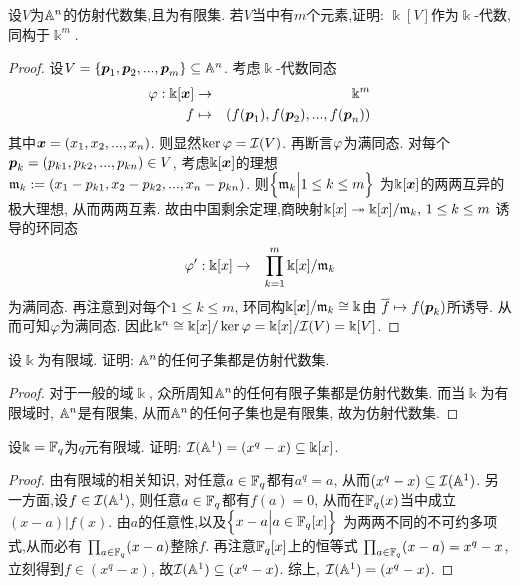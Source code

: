 \documentclass[oneside,a4papar,11pt,UTF8]{book}
\begin{document}
\begin{enumerate}
  \begin{prob}\label{ex-15-1-16}
    设$V$为$\mathbb{A}^n$的仿射代数集,且为有限集.
    若$V$当中有$m$个元素,证明:
    $\Bbbk[V]$作为$\Bbbk$-代数,同构于$\Bbbk^m$.
  \end{prob}

  \begin{proof}
    设$V=\{\boldsymbol{p}_1,\boldsymbol{p}_2,...,\boldsymbol{p}_m\}\subseteq\mathbb{A}^n$.
    考虑$\Bbbk$-代数同态
    \begin{eqnarray*}
      \varphi:\Bbbk[\boldsymbol{x}]&\to&\Bbbk^m\\
      f&\mapsto&(f(\boldsymbol{p}_1),f(\boldsymbol{p}_2),...,f(\boldsymbol{p}_n))
    \end{eqnarray*}
    其中$\boldsymbol{x}=(x_1,x_2,...,x_n)$.
    则显然$\ker\varphi=\mathcal{I}(V)$.
    再断言$\varphi$为满同态.
    对每个$\boldsymbol{p}_k=(p_{k1},p_{k2},...,p_{kn})\in V$,
    考虑$\Bbbk[\boldsymbol{x}]$的理想
    $\mathfrak{m}_k:=(x_1-p_{k1}, x_2-p_{k2},...,x_n-p_{kn})$.
    则$\Big\{ \mathfrak{m}_k \Big| 1\leq k\leq m \Big\}$
    为$\Bbbk[\boldsymbol{x}]$的两两互异的极大理想,
    从而两两互素.
    故由中国剩余定理,商映射$\Bbbk[x]\twoheadrightarrow\Bbbk[x]/\mathfrak{m}_k,\,1\leq k\leq m$
    诱导的环同态
    \begin{eqnarray*}
      \varphi':\Bbbk[x]&\to&\prod_{k=1}^{m}\Bbbk[x]/\mathfrak{m}_k
    \end{eqnarray*}
    为满同态.
    再注意到对每个$1\leq k\leq m$,
    环同构$\Bbbk[\boldsymbol{x}]/\mathfrak{m}_k\cong\Bbbk$由
    $\overline{f}\mapsto f(\boldsymbol{p}_k)$所诱导.
    从而可知$\varphi$为满同态.
    因此$\Bbbk^n\cong\Bbbk[x]/\ker\varphi=\Bbbk[x]/\mathcal{I}(V)=\Bbbk[V]$.

  \end{proof}

  \begin{prob}\label{ex-15-1-17}
    设$\Bbbk$为有限域.
    证明: $\mathbb{A}^n$的任何子集都是仿射代数集.
  \end{prob}

  \begin{proof}
    对于一般的域$\Bbbk$,
    众所周知$\mathbb{A}^n$的任何有限子集都是仿射代数集.
    而当$\Bbbk$为有限域时,
    $\mathbb{A}^n$是有限集,
    从而$\mathbb{A}^n$的任何子集也是有限集,
    故为仿射代数集.
  \end{proof}

  \begin{prob}\label{ex-15-1-18}
    设$\Bbbk=\mathbb{F}_q$为$q$元有限域.
    证明: $\mathcal{I}(\mathbb{A}^1)=(x^q-x)\subseteq\Bbbk[x]$.
  \end{prob}

  \begin{proof}
    由有限域的相关知识,
    对任意$a\in\mathbb{F}_q$都有$a^q=a$,
    从而$(x^q-x)\subseteq\mathcal{I}(\mathbb{A}^1)$.
    另一方面,设$f\in\mathcal{I}(\mathbb{A}^1)$,
    则任意$a\in\mathbb{F}_q$都有$f(a)=0$,
    从而在$\mathbb{F}_q(x)$当中成立$(x-a)|f(x)$.
    由$a$的任意性,以及$\Big\{ x-a \Big| a\in\mathbb{F}_q[x] \Big\}$
    为两两不同的不可约多项式,从而必有
    $\prod_{a\in\mathbb{F}_q}(x-a)$整除$f$.
    再注意$\mathbb{F}_q[x]$上的恒等式
    $\prod_{a\in\mathbb{F}_q}(x-a)=x^q-x$,
    立刻得到$f\in(x^q-x)$,
    故$\mathcal{I}(\mathbb{A}^1)\subseteq(x^q-x)$.
    综上, $\mathcal{I}(\mathbb{A}^1)=(x^q-x)$.
  \end{proof}


\end{enumerate}
\end{document}
